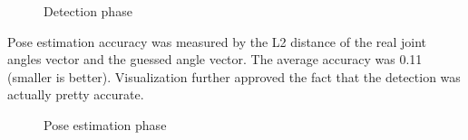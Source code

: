 \documentclass[a4paper]{article}
\begin{document}
\begin{figure}[h!]
  \centering
  \caption{Detection phase}
  \label{fig:detection}
\end{figure}

Pose estimation accuracy was measured by the L2 distance of the real joint
angles vector and the guessed angle vector. The average accuracy was 0.11
(smaller is better). Visualization further approved the fact that the detection
was actually pretty accurate.

\begin{figure}[h!]
  \centering
  \caption{Pose estimation phase}
  \label{fig:pose_estimate}
\end{figure}
\end{document}
